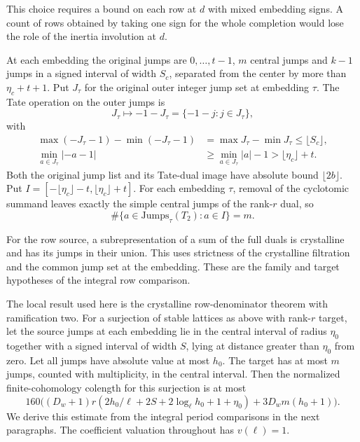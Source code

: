 This choice requires a bound on each row at \(d\)
with mixed embedding signs. A count of rows obtained
by taking one sign for the whole completion would
lose the role of the inertia involution at \(d\).
\label{cor:special-prime-lengths-7}

At each embedding the original jumps are
\(0,\ldots,t-1\), \(m\) central jumps and \(k-1\) jumps
in a signed interval of width \(S_c\), separated from
the center by more than \(\eta_c+t+1\).
Put \(J_\tau\) for the original outer integer jump set at
embedding \(\tau\). The Tate operation on the outer jumps is
\[
 J_\tau\longmapsto -1-J_\tau=\{-1-j:j\in J_\tau\},
\]
with
\[
 \begin{aligned}
 \max(-J_\tau-1)-\min(-J_\tau-1)
    &=\max J_\tau-\min J_\tau\le\lfloor S_c\rfloor,\\
 \min_{a\in J_\tau}|-a-1|
    &\ge\min_{a\in J_\tau}|a|-1>\lfloor\eta_c\rfloor+t .
 \end{aligned}
\]
Both the original jump list and its Tate-dual image have
absolute bound \(\lfloor2b\rfloor\). Put \(I=[-\lfloor\eta_c\rfloor-t,\lfloor\eta_c\rfloor+t]\). For each embedding \(\tau\), removal of the cyclotomic summand leaves exactly the simple central jumps of the rank-\(r\) dual, so
\[
 \#\{a\in\mathrm{Jumps}_\tau(T_2):a\in I\}=m.
\]

For the row source, a subrepresentation of a sum of
the full duals is crystalline and has its jumps in
their union. This uses strictness of the crystalline
filtration and the common jump set at the embedding.
These are the family and target hypotheses of the
integral row comparison.

The local result used here is the crystalline
row-denominator theorem with ramification two.
For a surjection of stable lattices as above with
rank-\(r\) target, let the source jumps at each
embedding lie in the central interval of radius
\(\eta_0\) together with a signed interval of width
\(S\), lying at distance greater than \(\eta_0\)
from zero. Let all jumps have absolute value at
most \(h_0\). The target has at most \(m\) jumps,
counted with multiplicity, in the central interval.
Then the normalized finite-cohomology colength
for this surjection is at most
\[
 160\bigl((D_w+1)r(2h_0/\ell+2S+
             2\log_\ell h_0+1+\eta_0)
                   +3D_w m(h_0+1)\bigr).
\]
We derive this estimate from the integral period comparisons in the
next paragraphs. The coefficient valuation throughout has
\(v(\ell)=1\). \label{cor:special-prime-lengths-8}






